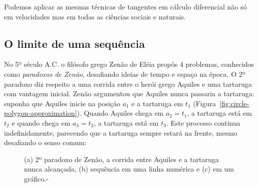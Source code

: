 Podemos aplicar as mesmas técnicas de tangentes em cálculo diferencial não só em velocidades mas em todas as ciências sociais e naturais.

\subsection{O limite de uma sequência}
No 5º século A.C. o filósofo grego Zenão de Eléia propôs 4 problemas, conhecidos como \emph{paradoxos de Zenão}, desafiando ideias de tempo e espaço na época. O 2º paradoxo diz respeito a uma corrida entre o herói grego Aquiles e uma tartaruga com vantagem inicial. Zenão argumentou que Aquiles nunca passaria a tartaruga: suponha que Aquiles inicie na posição $a_1$ e a tartaruga em $t_1$ (Figura~\ref{fig:circle-polygon-approximation}). Quando Aquiles chega em $a_2 = t_1$, a tartaruga está em $t_2$ e quando chega em $a_3=t_2$, a tartaruga está em $t_3$. Este processo continua indefinidamente, parecendo que a tartaruga sempre estará na frente, mesmo desafiando o senso comum:
\begin{figure}[!ht]
  \centering
  \begin{minipage}[b]{0.48\columnwidth}
  	\centering
  	\vfill
  \end{minipage}
  \usebox{\measurebox}\qquad
  \caption{(a) 2º paradoxo de Zenão, a corrida entre Aquiles e a tartaruga nunca alcançada, (b) sequência em uma linha numérica e (c) em um gráfico.-}
\end{figure}

